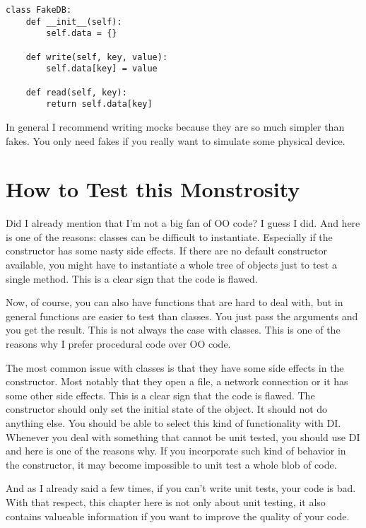 \begin{programcode}{}
\begin{verbatim}
class FakeDB:
    def __init__(self):
        self.data = {}

    def write(self, key, value):
        self.data[key] = value

    def read(self, key):
        return self.data[key]
\end{verbatim}
\end{programcode}


In general I recommend writing mocks because they are so much simpler than fakes. You only need fakes if you really want to simulate some physical device.


\chapter{How to Test this Monstrosity}\label{chap:how_do_i_test_this_monstrosity}

Did I already mention that I'm not a big fan of OO code? I guess I did. And here is one of the reasons: classes can be difficult to instantiate. Especially if the constructor has some nasty side effects. If there are no default constructor available, you might have to instantiate a whole tree of objects just to test a single method. This is a clear sign that the code is flawed.

Now, of course, you can also have functions that are hard to deal with, but in general functions are easier to test than classes. You just pass the arguments and you get the result. This is not always the case with classes. This is one of the reasons why I prefer procedural code over OO code.

The most common issue with classes is that they have some side effects in the constructor. Most notably that they open a file, a network connection or it has some other side effects. This is a clear sign that the code is flawed. The constructor should only set the initial state of the object. It should not do anything else. You should be able to select this kind of functionality with DI. Whenever you deal with something that cannot be unit tested, you should use DI and here is one of the reasons why. If you incorporate such kind of behavior in the constructor, it may become impossible to unit test a whole blob of code.

And as I already said a few times, if you can't write unit tests, your code is bad. With that respect, this chapter here is not only about unit testing, it also contains valueable information if you want to improve the quality of your code.

